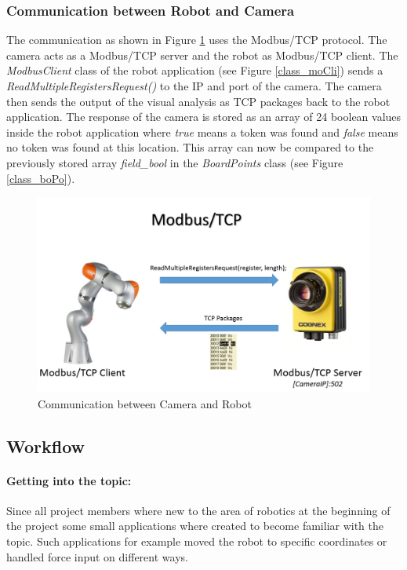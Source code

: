 \documentclass[a4paper]{spie}  %
\begin{document}
\begin{large}
\subsubsection{Communication between Robot and Camera}
\label{commu}
The communication as shown in Figure \ref{communication} uses the Modbus/TCP protocol. The camera acts as a Modbus/TCP server and the robot as Modbus/TCP client. The \emph{ModbusClient} class of the robot application (see Figure \ref{class_moCli})  sends a \emph{ReadMultipleRegistersRequest()} to the IP and port of the camera. The camera then sends the output of the visual analysis as TCP packages back to the robot application. The response of the camera is stored as an array of 24 boolean values inside the robot application where \emph{true} means a token was found and \emph{false} means no token was found at this location. This array can now be compared to the previously stored array \emph{field\_bool} in the \emph{BoardPoints} class (see Figure \ref{class_boPo}).
\begin{figure}[h]
\includegraphics[width=15cm]{images/communication.png}
\centering
\caption{Communication between Camera and Robot}
\label{communication}
\end{figure}
\clearpage
\subsection{Workflow}
\paragraph{Getting into the topic:} Since all project members where new to the area of robotics at the beginning of the project some small applications where created to become familiar with the topic. Such applications for example moved the robot to specific coordinates or handled force input on different ways.

\end{large}
\end{document}
